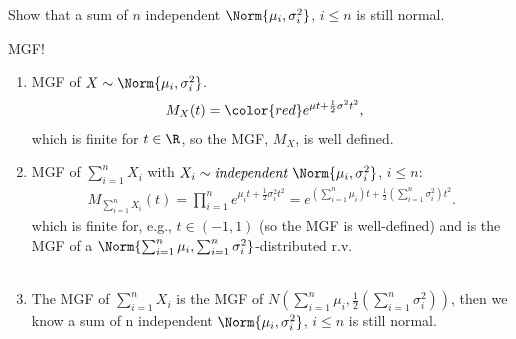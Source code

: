 \begin{exercise} 
	Show that a sum of $n$ independent $\Norm{\mu_i,\sigma^2_i}$, $i\leq n$ is still normal.
	\begin{hint} 
		MGF!
	\end{hint}
	\begin{solution}
		\begin{enumerate}
					\item MGF of $X \sim \Norm{\mu_i,\sigma^2_i}$.
			\begin{align*}
				{ M_X(t)}& =  {\color{red}e^{\mu t + \frac{1}{2}\sigma^2 t^2}}, 
			\end{align*}  {which is finite for $t\in \R$, so the MGF,  $M_X$, is well defined.} 
			\item MGF of $\sum_{i=1}^{n} X_i$ with $X_i\sim \textit{independent } \Norm{\mu_i,\sigma^2_i}$, $i\leq n$: 
			\begin{align*}
				M_{\sum_{i=1}^{n}X_i}(t) =\prod_{i=1}^{n} e^{\mu_i t + \frac{1}{2}\sigma_i^2 t^2}=e^{\left(\sum_{i=1}^{n} \mu_i\right) t + \frac{1}{2}\left(\sum_{i=1}^{n}\sigma_i^2\right) t^2 }.
			\end{align*}
			which is finite for, e.g., $t\in (-1, 1)$ (so the MGF is well-defined) and is the MGF of a $\Norm{\sum_{i=1}^{n}\mu_i, \sum_{i=1}^{n}\sigma_i^2}$-distributed r.v. \\~\\
			\item The MGF of   $\sum_{i=1}^{n} X_i$ is  the MGF of $N\left(\sum_{i=1}^{n}\mu_i, \frac{1}{2}\left(\sum_{i=1}^{n}\sigma_i^2\right)\right)$, then we know a  sum of n independent $\Norm{\mu_i,\sigma^2_i}$, $i\leq n$ is still normal.
		\end{enumerate}
	\end{solution}
\end{exercise}



